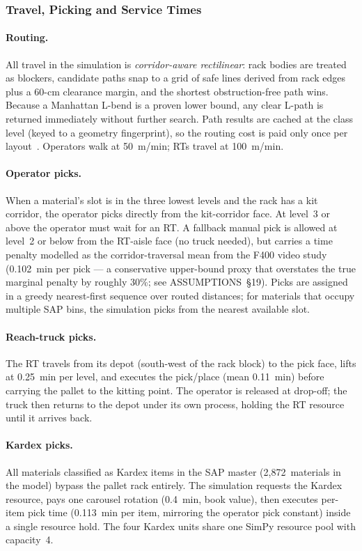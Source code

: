 \subsubsection{Travel, Picking and Service Times}

\paragraph{Routing.}
All travel in the simulation is \emph{corridor-aware rectilinear}: rack
bodies are treated as blockers, candidate paths snap to a grid of safe lines
derived from rack edges plus a 60-cm clearance margin, and the shortest
obstruction-free path wins. Because a Manhattan L-bend is a proven lower
bound, any clear L-path is returned immediately without further search. Path
results are cached at the class level (keyed to a geometry fingerprint), so
the routing cost is paid only once per layout~\cite{bartholdi2014}. Operators
walk at 50~m/min; RTs travel at 100~m/min.

\paragraph{Operator picks.}
When a material's slot is in the three lowest levels and the rack has a kit
corridor, the operator picks directly from the kit-corridor face. At level~3 or above
the operator must wait for an RT. A fallback manual pick is allowed at
level~2 or below from the RT-aisle face (no truck needed), but carries a time
penalty modelled as the corridor-traversal mean from the F400 video study
(0.102~min per pick --- a conservative upper-bound proxy that overstates the
true marginal penalty by roughly 30\%; see ASSUMPTIONS~\S19). Picks are
assigned in a greedy nearest-first sequence over routed distances; for
materials that occupy multiple SAP bins, the simulation picks from the
nearest available slot.

\paragraph{Reach-truck picks.}
The RT travels from its depot (south-west of the rack block) to the pick
face, lifts at 0.25~min per level, and executes the pick/place (mean
0.11~min) before carrying the pallet to the kitting point. The operator is
released at drop-off; the truck then returns to the depot under its own
process, holding the RT resource until it arrives back.

\paragraph{Kardex picks.}
All materials classified as Kardex items in the SAP master (2,872~materials
in the model) bypass the pallet rack entirely. The simulation requests the
Kardex resource, pays one carousel rotation (0.4~min, book value), then
executes per-item pick time (0.113~min per item, mirroring the operator
pick constant) inside a single resource hold. The four Kardex units share one
SimPy resource pool with capacity~4.

